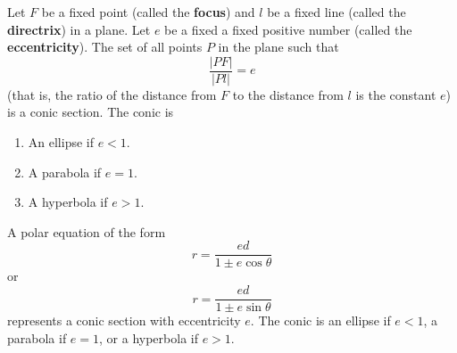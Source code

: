 \begin{theorem}
    Let \(F\) be a fixed point (called the \textbf{focus}) and \(l\) be a
    fixed line (called the \textbf{directrix}) in a plane.
    Let \(e\) be a fixed a fixed positive number (called the
    \textbf{eccentricity}).
    The set of all points \(P\) in the plane such that
    \[\frac{|PF|}{|Pl|}=e\]
    (that is, the ratio of the distance from \(F\) to the distance from \(l\)
    is the constant \(e\)) is a conic section.
    The conic is
    \begin{enumerate}
        \item An ellipse if \(e<1\).
        \item A parabola if \(e=1\).
        \item A hyperbola if \(e>1\).
    \end{enumerate}
\end{theorem}
\begin{theorem}
    A polar equation of the form
    \[r=\frac{ed}{1\pm e\cos\theta}\]
    or
    \[r=\frac{ed}{1\pm e\sin\theta}\]
    represents a conic section with eccentricity \(e\).
    The conic is an ellipse if \(e<1\), a parabola if \(e=1\), or a hyperbola
    if \(e>1\).
\end{theorem}